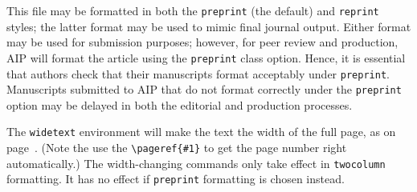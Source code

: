 \documentclass[%
 aip,
 amsmath,amssymb,
 reprint,%
]{revtex4-1}
\begin{document}
This file may be formatted in both the \texttt{preprint} (the default) and
\texttt{reprint} styles; the latter format may be used to
mimic final journal output. Either format may be used for submission
purposes; however, for peer review and production, AIP will format the
article using the \texttt{preprint} class option. Hence, it is
essential that authors check that their manuscripts format acceptably
under \texttt{preprint}. Manuscripts submitted to AIP that do not
format correctly under the \texttt{preprint} option may be delayed in
both the editorial and production processes.

The \texttt{widetext} environment will make the text the width of the
full page, as on page~\pageref{eq:wideeq}. (Note the use the
\verb+\pageref{#1}+ to get the page number right automatically.) The
width-changing commands only take effect in \texttt{twocolumn}
formatting. It has no effect if \texttt{preprint} formatting is chosen
instead.
\end{document}
